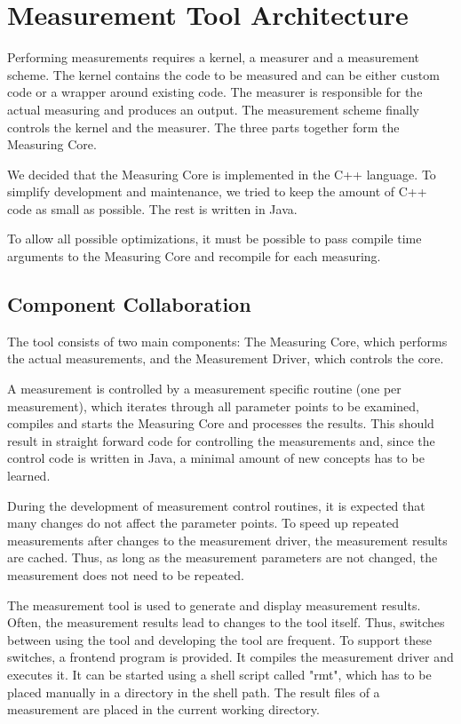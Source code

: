 \documentclass[a4paper,12pt]{article}
\begin{document}
\section{Measurement Tool Architecture}
Performing measurements requires a kernel, a measurer and a measurement scheme. The kernel contains the code to be measured and can be either custom code or a wrapper around existing code. The measurer is responsible for the actual measuring and produces an output. The measurement scheme finally controls the kernel and the measurer. The three parts together form the Measuring Core.

We decided that the Measuring Core is implemented in the C++ language. To simplify development and maintenance, we tried to keep the amount of C++ code as small as possible. The rest is written in Java.

To allow all possible optimizations, it must be possible to pass compile time arguments to the Measuring Core and recompile for each measuring.

\subsection{Component Collaboration}
The tool consists of two main components: The Measuring Core, which performs the actual measurements, and the Measurement Driver, which controls the core.

A measurement is controlled by a measurement specific routine (one per measurement), which iterates through all parameter points to be examined, compiles and starts the Measuring Core and processes the results. This should result in straight forward code for controlling the measurements and, since the control code is written in Java, a minimal amount of new concepts has to be learned.

During the development of measurement control routines, it is expected that many changes do not affect the parameter points. To speed up repeated measurements after changes to the measurement driver, the measurement results are cached. Thus, as long as the measurement parameters are not changed, the measurement does not need to be repeated.

The measurement tool is used to generate and display measurement results. Often, the measurement results lead to changes to the tool itself. Thus, switches between using the tool and developing the tool are frequent. To support these switches, a frontend program is provided. It compiles the measurement driver and executes it. It can be started using a shell script called "rmt", which has to be placed manually in a directory in the shell path. The result files of a measurement are placed in the current working directory.
\end{document}
